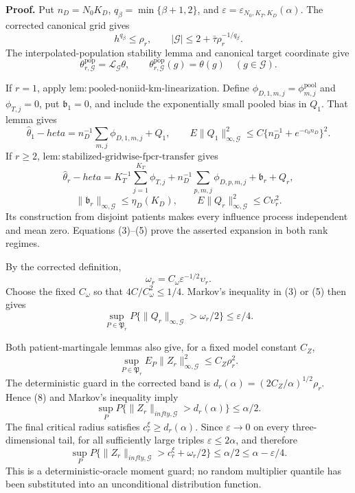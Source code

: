 \textbf{Proof.}
Put \(n_D=N_0K_D\), \(q_\beta=\min\{\beta+1,2\}\), and \(\varepsilon=\varepsilon_{N_0,K_T,K_D}(\alpha)\). The corrected canonical grid gives
\[
 h^{q_\beta}\le\rho_r,
 \qquad |\mathcal G|\le2+\bar\tau\rho_r^{-1/q_\beta}.     \tag{1}
\]
The interpolated-population stability lemma and canonical target coordinate give
\[
 \theta^{\mathrm{pop}}_{r,\mathcal G}
 =\mathcal L_{\mathcal G}\theta,
 \qquad \theta^{\mathrm{pop}}_{r,\mathcal G}(g)=\theta(g)
 \quad(g\in\mathcal G).                                   \tag{2}
\]

If \(r=1\), apply \(\mathrm{lem:pooled\mbox{-}noniid\mbox{-}km\mbox{-}linearization}\). Define \(\phi_{D,1,m,j}=\phi_{m,j}^{\mathrm{pool}}\) and \(\phi_{T,j}=0\), put \(\mathfrak b_1=0\), and include the exponentially small pooled bias in \(Q_1\). That lemma gives
\[
 \widehat\theta_1-  heta
 =n_D^{-1}\sum_{m,j}\phi_{D,1,m,j}+Q_1,
 \qquad E\|Q_1\|_{\infty,\mathcal G}^2
 \le C\{n_D^{-1}+e^{-c_0n_D}\}^2.                        \tag{3}
\]
If \(r\ge2\), \(\mathrm{lem:stabilized\mbox{-}gridwise\mbox{-}fpcr\mbox{-}transfer}\) gives
\[
 \widehat\theta_r-  heta
 =K_T^{-1}\sum_{j=1}^{K_T}\phi_{T,j}
 +n_D^{-1}\sum_{p,m,j}\phi_{D,p,m,j}
 +\mathfrak b_r+Q_r,                                      \tag{4}
\]
\[
 \|\mathfrak b_r\|_{\infty,\mathcal G}\le\eta_D(K_D),
 \qquad E\|Q_r\|_{\infty,\mathcal G}^2\le C\upsilon_r^2. \tag{5}
\]
Its construction from disjoint patients makes every influence process independent and mean zero. Equations (3)--(5) prove the asserted expansion in both rank regimes.

By the corrected definition,
\[
 \omega_r=C_\omega\varepsilon^{-1/2}\upsilon_r.          \tag{6}
\]
Choose the fixed \(C_\omega\) so that \(4C/C_\omega^2\le1/4\). Markov's inequality in (3) or (5) then gives
\[
 \sup_{P\in\mathfrak P_r}P\{\|Q_r\|_{\infty,\mathcal G}>\omega_r/2\}
 \le\varepsilon/4.                                        \tag{7}
\]

Both patient-martingale lemmas also give, for a fixed model constant \(C_Z\),
\[
 \sup_{P\in\mathfrak P_r}E_P\|Z_r\|_{\infty,\mathcal G}^2
 \le C_Z\rho_r^2.                                         \tag{8}
\]
The deterministic guard in the corrected band is
\(d_r(\alpha)=(2C_Z/\alpha)^{1/2}\rho_r\). Hence (8) and Markov's inequality imply
\[
 \sup_PP\{\|Z_r\|_{infty,\mathcal G}>d_r(\alpha)\}
 \le\alpha/2.                                             \tag{9}
\]
The final critical radius satisfies \(c_r^\xi\ge d_r(\alpha)\). Since \(\varepsilon\to0\) on every three-dimensional tail, for all sufficiently large triples \(\varepsilon\le2\alpha\), and therefore
\[
 \sup_PP\{\|Z_r\|_{infty,\mathcal G}>c_r^\xi+\omega_r/2\}
 \le\alpha/2\le\alpha-\varepsilon/4.                    \tag{10}
\]
This is a deterministic-oracle moment guard; no random multiplier quantile has been substituted into an unconditional distribution function.

